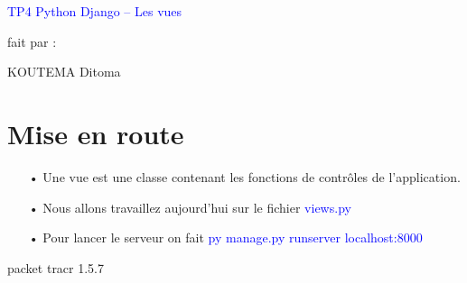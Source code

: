 \documentclass[10pt,a4paper]{article}
\author{KOUTEMA Ditoma}
\begin{document}

\begin{shadedbox}
\begin{center}
\huge \textcolor{blue}{TP4 Python Django – Les vues}
\end{center}
\end{shadedbox}
\large{\begin{center}
fait par : 
\end{center}}
\begin{center}
\huge{KOUTEMA Ditoma}
\end{center}
\newpage
\tableofcontents
\newpage

\section{Mise en route}
\begin{enumerate}
\item[•] Une vue est une classe contenant les fonctions de contrôles de  l'application.
\item[•] Nous allons travaillez aujourd'hui sur le fichier \textcolor{blue}{views.py}
\item[•] Pour lancer le serveur on fait \textcolor{blue}{py manage.py runserver localhost:8000}

\end{enumerate}packet tracr 1.5.7
\end{document}
